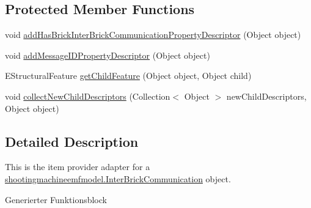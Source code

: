 \subsection*{Protected Member Functions}
\begin{DoxyCompactItemize}
\item 
void \hyperlink{classshootingmachineemfmodel_1_1provider_1_1_inter_brick_communication_item_provider_a1ef04ef70c7ea7a4ec9d3c02db01af02}{add\-Has\-Brick\-Inter\-Brick\-Communication\-Property\-Descriptor} (Object object)
\item 
void \hyperlink{classshootingmachineemfmodel_1_1provider_1_1_inter_brick_communication_item_provider_ad0cd9171ab6c0f3c51e36566cffd12d6}{add\-Message\-I\-D\-Property\-Descriptor} (Object object)
\item 
E\-Structural\-Feature \hyperlink{classshootingmachineemfmodel_1_1provider_1_1_inter_brick_communication_item_provider_a36cfd0dce472c3f626958b0a82fe094e}{get\-Child\-Feature} (Object object, Object child)
\item 
void \hyperlink{classshootingmachineemfmodel_1_1provider_1_1_inter_brick_communication_item_provider_a049e4e706d8830dfa175494cbef7f36a}{collect\-New\-Child\-Descriptors} (Collection$<$ Object $>$ new\-Child\-Descriptors, Object object)
\end{DoxyCompactItemize}


\subsection{Detailed Description}
This is the item provider adapter for a \hyperlink{interfaceshootingmachineemfmodel_1_1_inter_brick_communication}{shootingmachineemfmodel.\-Inter\-Brick\-Communication} object.

Generierter Funktionsblock 

